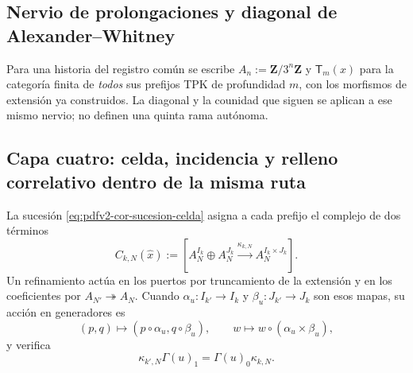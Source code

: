 \subsection{Nervio de prolongaciones y diagonal de Alexander--Whitney}
Para una historia del registro común se escribe
\(A_n:=\mathbf Z/3^n\mathbf Z\) y \(\mathsf T_m(x)\) para la categoría
finita de \emph{todos} sus prefijos TPK de profundidad \(m\), con los
morfismos de extensión ya construidos. La diagonal y la counidad que siguen
se aplican a ese mismo nervio; no definen una quinta rama autónoma.
\begingroup
  \let\section\subsection
  
\endgroup

\section{Capa cuatro: celda, incidencia y relleno correlativo dentro de la misma ruta}

La sucesión \eqref{eq:pdfv2-cor-sucesion-celda} asigna a cada prefijo el
complejo de dos términos
\begin{equation}
\label{eq:pdfv2-cor-cono-celda}
 C_{k,N}(\widehat x):=
 \left[A_N^{I_k}\oplus A_N^{J_k}
 \xrightarrow{\kappa_{k,N}}A_N^{I_k\times J_k}\right].
\end{equation}
Un refinamiento actúa en los puertos por truncamiento de la extensión y en
los coeficientes por \(A_{N'}\twoheadrightarrow A_N\). Cuando
\(\alpha_u:I_{k'}\to I_k\) y \(\beta_u:J_{k'}\to J_k\) son esos mapas, su
acción en generadores es
\begin{equation}
\label{eq:pdfv2-cor-refinamiento-celda}
 (p,q)\longmapsto(p\circ\alpha_u,q\circ\beta_u),
 \qquad
 w\longmapsto w\circ(\alpha_u\times\beta_u),
\end{equation}
y verifica
\begin{equation}
\label{eq:pdfv2-cor-refinamiento-cadena}
 \kappa_{k',N}\Gamma(u)_1=\Gamma(u)_0\kappa_{k,N}.
\end{equation}

